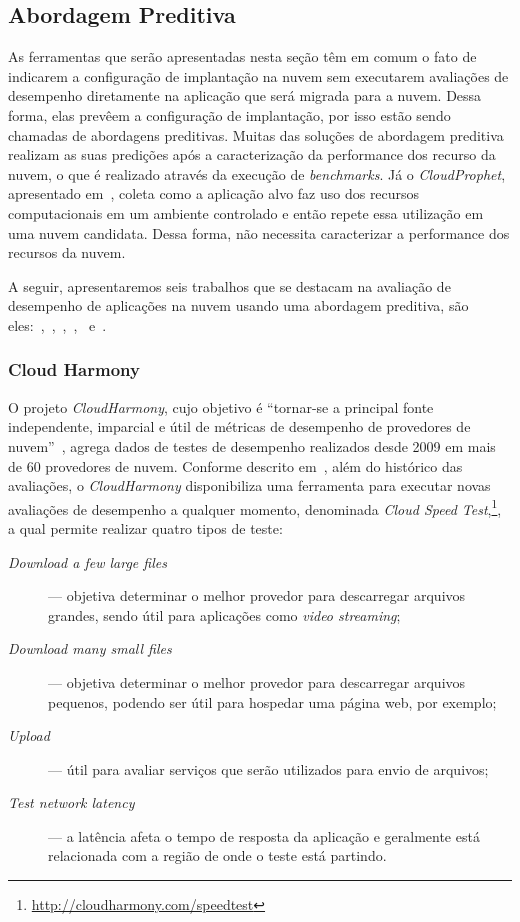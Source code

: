 \subsection{Abordagem Preditiva}

As ferramentas que serão apresentadas nesta seção têm em comum o fato de
indicarem a configuração de implantação na nuvem sem executarem avaliações de
desempenho diretamente na aplicação que será migrada para a nuvem. Dessa forma,
elas prevêem a configuração de implantação, por isso estão sendo chamadas de
abordagens preditivas. Muitas das soluções de abordagem preditiva realizam as
suas predições após a caracterização da performance dos recurso da nuvem, o que
é realizado através da execução de \textit{benchmarks}. Já o
\textit{CloudProphet}, apresentado em~\cite{li2011cloudprophet}, coleta como a
aplicação alvo faz uso dos recursos computacionais em um ambiente controlado e
então repete essa utilização em uma nuvem candidata. Dessa forma, não necessita
caracterizar a performance dos recursos da nuvem.

A seguir, apresentaremos seis trabalhos que se destacam na avaliação de
desempenho de aplicações na nuvem usando uma abordagem preditiva, são
eles:~\cite{cloudharmony},~\cite{malkowski2010cloudxplor},~\cite{li2011},~\cite{jung2013cloudadvisor},~\cite{fittkau2012cdosim}
e~\cite{li2011cloudprophet}.

\subsubsection{Cloud Harmony}
O projeto {\em CloudHarmony}, cujo
objetivo é ``tornar-se a principal fonte independente, imparcial e útil de
métricas de desempenho de provedores de nuvem''~\cite{cloudharmony}, agrega
dados de testes de desempenho realizados desde 2009 em mais de 60 provedores de
nuvem. Conforme descrito em~\cite{cunha2012ambiente}, além do histórico das
avaliações, o {\em CloudHarmony} disponibiliza uma ferramenta para executar novas avaliações de desempenho a qualquer momento, denominada \textit{Cloud Speed Test},\footnote{\url{http://cloudharmony.com/speedtest}}, a qual permite realizar quatro tipos de teste:

\begin{description}
  \item[\em Download a few large files] --- objetiva determinar o melhor provedor
  para descarregar arquivos grandes, sendo útil para aplicações como {\em video
  streaming};
  \item[\em Download many small files] --- objetiva determinar o melhor provedor
  para descarregar arquivos pequenos, podendo ser útil para hospedar uma página
  web, por exemplo;
  \item[\em Upload] --- útil para avaliar serviços que serão utilizados para
  envio de arquivos;
  \item[\em Test network latency] --- a latência afeta o tempo de resposta da
  aplicação e geralmente está relacionada com a região de onde o teste está
  partindo.
\end{description}


